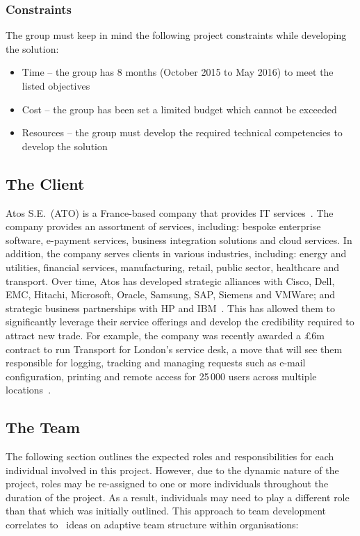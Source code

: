 \subsubsection{Constraints}

The group must keep in mind the following project constraints while developing the solution:

\begin{itemize}
	\item Time -- the group has 8 months (October 2015 to May 2016) to meet the listed objectives
	\item Cost -- the group has been set a limited budget which cannot be exceeded
	\item Resources -- the group must develop the required technical competencies to develop the solution
\end{itemize}

\subsection{The Client}

Atos S.E.~(ATO) is a France-based company that provides IT services~\parencite{web:reuters}. The company provides an assortment of services, including: bespoke enterprise software, e-payment services, business integration solutions and cloud services. In addition, the company serves clients in various industries, including: energy and utilities, financial services, manufacturing, retail, public sector, healthcare and transport. Over time, Atos has developed strategic alliances with Cisco, Dell, EMC, Hitachi, Microsoft, Oracle, Samsung, SAP, Siemens and VMWare; and strategic business partnerships with HP and IBM~\parencite{web:bloomberg}. This has allowed them to significantly leverage their service offerings and develop the credibility required to attract new trade. For example, the company was recently awarded a \pounds 6m contract to run Transport for London's service desk, a move that will see them responsible for logging, tracking and managing requests such as e-mail configuration, printing and remote access for 25\,000 users across multiple locations~\parencite{web:jee}.

\subsection{The Team}

The following section outlines the expected roles and responsibilities for each individual involved in this project. However, due to the dynamic nature of the project, roles may be re-assigned to one or more individuals throughout the duration of the project. As a result, individuals may need to play a different role than that which was initially outlined. This approach to team development correlates to~\textcite{book:xteams} ideas on adaptive team structure within organisations:

